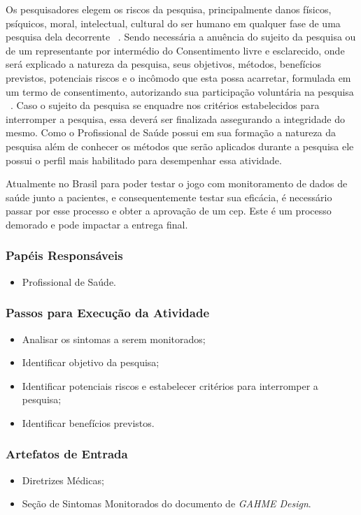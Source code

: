 Os pesquisadores elegem os riscos da pesquisa, principalmente danos físicos, psíquicos, moral, intelectual, cultural do ser humano em qualquer fase de uma pesquisa dela decorrente ~\cite{conselho2000normas}. Sendo necessária a anuência do sujeito da pesquisa ou de um representante por intermédio do Consentimento livre e esclarecido, onde será explicado a natureza da pesquisa, seus objetivos, métodos, benefícios previstos, potenciais riscos e o incômodo que esta possa acarretar, formulada em um termo de consentimento, autorizando sua participação voluntária na pesquisa ~\cite{conselho2000normas}. Caso o sujeito da pesquisa se enquadre nos critérios estabelecidos para interromper a pesquisa, essa deverá ser finalizada assegurando a integridade do mesmo. Como o Profissional de Saúde possui em sua formação a natureza da pesquisa além de conhecer os métodos que serão aplicados durante a pesquisa ele possui o perfil mais habilitado para desempenhar essa atividade.


Atualmente no Brasil para poder testar o jogo com monitoramento de dados de saúde junto a pacientes, e consequentemente testar sua eficácia, é necessário passar por esse processo e obter a aprovação de um \ac{cep}. Este é um processo demorado e pode impactar a entrega final.

\subsubsection{Papéis Responsáveis}
\begin{itemize}
	\item Profissional de Saúde.
\end{itemize}

\subsubsection{Passos para Execução da Atividade}
\begin{itemize}
	\item Analisar os sintomas a serem monitorados;
	\item Identificar objetivo da pesquisa;
	\item Identificar potenciais riscos e estabelecer critérios para interromper a pesquisa;
	\item Identificar benefícios previstos.
\end{itemize}

\subsubsection{Artefatos de Entrada}
\begin{itemize}
	\item Diretrizes Médicas;
	\item Seção de Sintomas Monitorados do documento de \textit{GAHME Design}.
\end{itemize}

